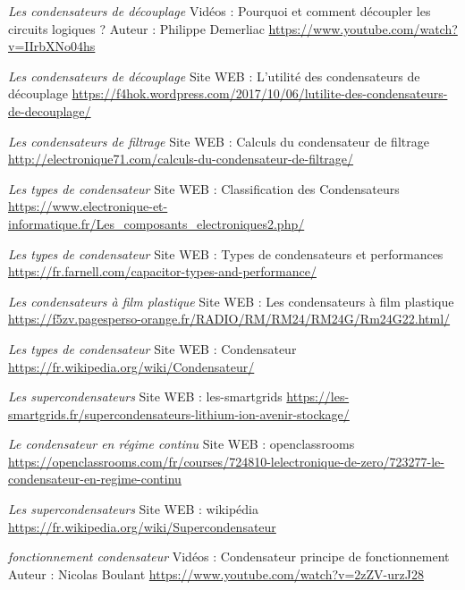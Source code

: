\begin{thebibliography}{9}

\bibitem{}
	  \emph{Les condensateurs de découplage}
	  \newline
	  Vidéos : Pourquoi et comment découpler les circuits logiques ? \n
	  Auteur : Philippe Demerliac \n
      \url{https://www.youtube.com/watch?v=IIrbXNo04hs}

\bibitem{}
	  \emph{Les condensateurs de découplage}
	  \newline
	  Site WEB : L'utilité des condensateurs de découplage \n
      \url{https://f4hok.wordpress.com/2017/10/06/lutilite-des-condensateurs-de-decouplage/}

\bibitem{}
	  \emph{Les condensateurs de filtrage}
	  \newline
	  Site WEB : Calculs du condensateur de filtrage \n
      \url{http://electronique71.com/calculs-du-condensateur-de-filtrage/}

\bibitem{}
	  \emph{Les types de condensateur}
	  \newline
	  Site WEB : Classification des Condensateurs \n
      \url{https://www.electronique-et-informatique.fr/Les_composants_electroniques2.php/}

\bibitem{}
	  \emph{Les types de condensateur}
	  \newline
	  Site WEB : Types de condensateurs et performances \n
	  \url{https://fr.farnell.com/capacitor-types-and-performance/}
      
\bibitem{}
	  \emph{Les condensateurs à film plastique}
	  \newline
	  Site WEB : Les condensateurs à film plastique \n
      \url{https://f5zv.pagesperso-orange.fr/RADIO/RM/RM24/RM24G/Rm24G22.html/}	
      
\bibitem{}
	  \emph{Les types de condensateur}
	  \newline
	  Site WEB : Condensateur \n                     
      \url{https://fr.wikipedia.org/wiki/Condensateur/}  
      
\bibitem{}
	  \emph{Les supercondensateurs}
	  \newline
	  Site WEB : les-smartgrids \n
      \url{https://les-smartgrids.fr/supercondensateurs-lithium-ion-avenir-stockage/}

\bibitem{}
	  \emph{Le condensateur en régime continu}
	  \newline
	  Site WEB : openclassrooms \n
	  \url{https://openclassrooms.com/fr/courses/724810-lelectronique-de-zero/723277-le-condensateur-en-regime-continu}

\bibitem{}
	  \emph{Les supercondensateurs}
	  \newline
	  Site WEB : wikipédia \n              
	  \url{https://fr.wikipedia.org/wiki/Supercondensateur}


\bibitem{}
	  \emph{fonctionnement condensateur}
	  \newline
	  Vidéos : Condensateur principe de fonctionnement  \n
	  Auteur : Nicolas Boulant \n
      \url{https://www.youtube.com/watch?v=2zZV-urzJ28}
\end{thebibliography}
